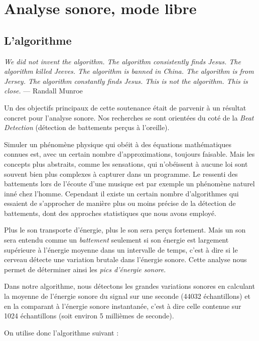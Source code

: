 \documentclass[12pt,a4paper]{article}
\begin{document}
	\section{Analyse sonore, mode libre}
	\subsection{L'algorithme}
	\par \emph{We did not invent the algorithm. The algorithm consistently finds Jesus. The algorithm killed Jeeves.
The algorithm is banned in China. The algorithm is from Jersey. The algorithm constantly finds Jesus.
This is not the algorithm. This is close.} --- Randall Munroe
\vspace{0.8cm}
	\par	
	Un des objectifs principaux de cette soutenance était de parvenir à un résultat concret pour l'analyse sonore. Nos recherches se sont orientées du coté de la \emph{Beat Detection} (détection de battements perçus à l'oreille).
	\par Simuler un phénomène physique qui obéit à des équations mathématiques connues est, avec un certain nombre d'approximations, toujours faisable. Mais les concepts plus abstraits, comme les sensations, qui n'obéissent à aucune loi sont souvent bien plus complexes à capturer dans un programme. Le ressenti des battements lors de l'écoute d'une musique est par exemple un phénomène naturel inné chez l'homme. Cependant il existe un certain nombre d'algorithmes qui essaient de s'approcher de manière plus ou moins précise de la détection de battements, dont des approches statistiques que nous avons employé.
	\par Plus le son transporte d'énergie, plus le son sera perçu fortement. Mais un son sera entendu comme un \emph{battement} seulement si son énergie est largement supérieure à l'énergie moyenne dans un intervalle de temps, c'est à dire si le cerveau détecte une variation brutale dans l'énergie sonore. Cette analyse nous permet de déterminer ainsi les \emph{pics d'énergie sonore}.
	\par Dans notre algorithme, nous détectons les grandes variations sonores en calculant la moyenne de l'énergie sonore du signal sur une seconde (44032 échantillons) et en la comparant à l'énergie sonore instantanée, c'est à dire celle contenue sur 1024 échantillons (soit environ 5 millièmes de seconde).
	\par On utilise donc l'algorithme suivant :
\end{document}
